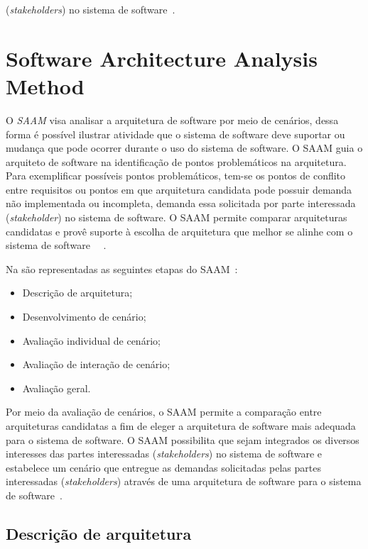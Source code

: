 (\emph{stakeholders}) no sistema de software~\cite{ATAM}.

\section{Software Architecture Analysis Method}
\label{sec:SAAM}

O \emph{\acrfull{SAAM}} visa analisar a arquitetura de software por meio de cenários, dessa forma é possível ilustrar atividade que o sistema de software deve suportar ou mudança que pode ocorrer durante o uso do sistema de software. O SAAM guia o arquiteto de software na identificação de pontos problemáticos na arquitetura. Para exemplificar possíveis pontos problemáticos, tem-se os pontos de conflito entre requisitos ou pontos em que arquitetura candidata pode possuir demanda não implementada ou incompleta, demanda essa solicitada por parte interessada (\emph{stakeholder}) no sistema de software. O SAAM permite comparar arquiteturas candidatas e provê suporte à escolha de arquitetura que melhor se alinhe com o sistema de software ~\cite{survey_methods}~\cite{scenario_methods}.

%

Na  são representadas as seguintes etapas do SAAM~\cite{scenario_methods}:
\begin{itemize}
    \item Descrição de arquitetura;
    \item Desenvolvimento de cenário;
    \item Avaliação individual de cenário;
    \item Avaliação de interação de cenário;
    \item Avaliação geral.
\end{itemize}

Por meio da avaliação de cenários, o SAAM permite a comparação entre  arquiteturas candidatas a fim de eleger a arquitetura de software mais adequada para o sistema de software. O SAAM possibilita que sejam integrados os diversos interesses das partes interessadas (\emph{stakeholders}) no sistema de software e estabelece um cenário que entregue as demandas solicitadas pelas partes interessadas (\emph{stakeholders}) através de uma arquitetura de software para o sistema de software~\cite{survey_methods}.

\subsection{Descrição de arquitetura}

